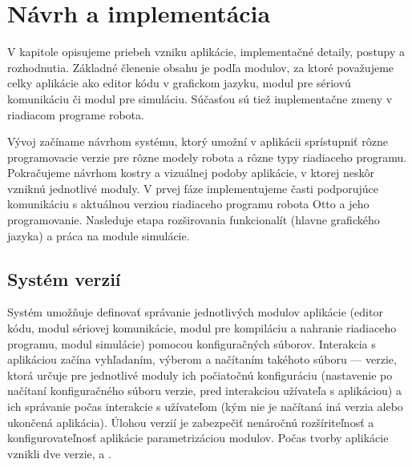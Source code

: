 
\chapter{Návrh a implementácia}
\label{kap:implementacia}

V kapitole opisujeme priebeh vzniku aplikácie, implementačné detaily, postupy a rozhodnutia. Základné členenie obsahu je podľa modulov, za ktoré považujeme celky aplikácie ako editor kódu v grafickom jazyku, modul pre sériovú komunikáciu či modul pre simuláciu. Súčasťou sú tiež implementačne zmeny v riadiacom programe robota.

Vývoj začíname návrhom systému, ktorý umožní v aplikácii sprístupniť rôzne programovacie verzie pre rôzne modely robota a rôzne typy riadiaceho programu. Pokračujeme návrhom kostry a vizuálnej podoby aplikácie, v ktorej neskôr vzniknú jednotlivé moduly. V prvej fáze implementujeme časti podporujúce komunikáciu s aktuálnou verziou riadiaceho programu robota Otto a jeho programovanie. Nasleduje etapa rozširovania funkcionalít (hlavne grafického jazyka) a práca na module simulácie.




\section{Systém verzií}
\label{sec:system-verzii}
Systém umožňuje definovať správanie jednotlivých modulov aplikácie (editor kódu, modul sériovej komunikácie, modul pre kompiláciu a nahranie riadiaceho programu, modul simulácie) pomocou konfiguračných súborov. Interakcia s aplikáciou začína vyhľadaním, výberom a načítaním takéhoto súboru --- verzie, ktorá určuje pre jednotlivé moduly ich počiatočnú konfiguráciu (nastavenie po načítaní konfiguračného súboru verzie, pred interakciou užívateľa s aplikáciou) a ich správanie počas interakcie s užívateľom (kým nie je načítaná iná verzia alebo ukončená aplikácia). Úlohou verzií je zabezpečiť nenáročnú rozšíriteľnosť a konfigurovateľnosť aplikácie parametrizáciou modulov. Počas tvorby aplikácie vznikli dve verzie,  a .

